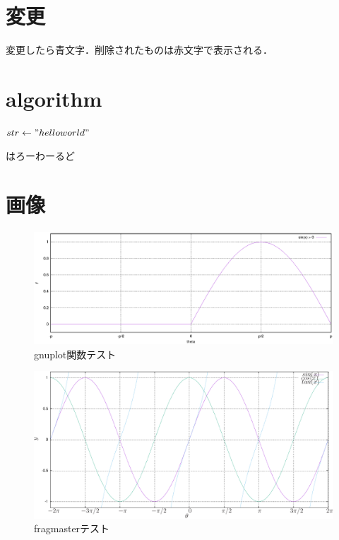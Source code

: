\section{変更}
変更したら青文字．削除されたものは赤文字で表示される．

\section{algorithm}
\begin{algorithm}
\begin{algorithmic}[1]
    \State $str \gets "hello world"$
    \EndFor
    \EndFunction
\end{algorithmic}
\caption{はろーわーるど}
\label{alg:hello_world}
\end{algorithm}

\section{画像}

\begin{figure}[t]
    \centering
    \includegraphics[width=\linewidth]{images/gnuplot_func.eps}
    \caption{gnuplot関数テスト}
    \label{fig:func}
\end{figure}

\begin{figure}[t]
    \centering
    \includegraphics[width=\linewidth]{images/replot.pdf}
    \caption{fragmasterテスト}
    \label{fig:fragmaster}
\end{figure}


